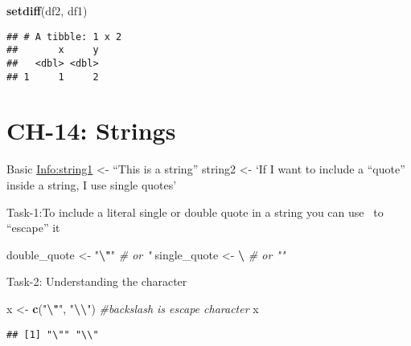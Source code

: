\documentclass[
]{article}
\newenvironment{Shaded}{\begin{snugshade}}{\end{snugshade}}
\newcommand{\CommentTok}[1]{\textcolor[rgb]{0.56,0.35,0.01}{\textit{#1}}}
\newcommand{\FunctionTok}[1]{\textcolor[rgb]{0.13,0.29,0.53}{\textbf{#1}}}
\newcommand{\NormalTok}[1]{#1}
\newcommand{\OtherTok}[1]{\textcolor[rgb]{0.56,0.35,0.01}{#1}}
\newcommand{\SpecialCharTok}[1]{\textcolor[rgb]{0.81,0.36,0.00}{\textbf{#1}}}
\newcommand{\StringTok}[1]{\textcolor[rgb]{0.31,0.60,0.02}{#1}}
\begin{document}
\begin{Shaded}
\begin{Highlighting}[]
\FunctionTok{setdiff}\NormalTok{(df2, df1)}
\end{Highlighting}
\end{Shaded}

\begin{verbatim}
## # A tibble: 1 x 2
##       x     y
##   <dbl> <dbl>
## 1     1     2
\end{verbatim}

\hypertarget{ch-14-strings}{%
\section{CH-14: Strings}\label{ch-14-strings}}

Basic \url{Info:string1} \textless- ``This is a string'' string2
\textless- `If I want to include a ``quote'' inside a string, I use
single quotes'

Task-1:To include a literal single or double quote in a string you can
use ~to ``escape'' it

\begin{Shaded}
\begin{Highlighting}[]
\NormalTok{double\_quote }\OtherTok{\textless{}{-}} \StringTok{"}\SpecialCharTok{\textbackslash{}"}\StringTok{"} \CommentTok{\# or \textquotesingle{}"\textquotesingle{}}
\NormalTok{single\_quote }\OtherTok{\textless{}{-}} \StringTok{\textquotesingle{}}\SpecialCharTok{\textbackslash{}\textquotesingle{}}\StringTok{\textquotesingle{}} \CommentTok{\# or "\textquotesingle{}"}
\end{Highlighting}
\end{Shaded}

Task-2: Understanding the character

\begin{Shaded}
\begin{Highlighting}[]
\NormalTok{x }\OtherTok{\textless{}{-}} \FunctionTok{c}\NormalTok{(}\StringTok{"}\SpecialCharTok{\textbackslash{}"}\StringTok{"}\NormalTok{, }\StringTok{"}\SpecialCharTok{\textbackslash{}\textbackslash{}}\StringTok{"}\NormalTok{) }\CommentTok{\#backslash is escape character}
\NormalTok{x}
\end{Highlighting}
\end{Shaded}

\begin{verbatim}
## [1] "\"" "\\"
\end{verbatim}
\end{document}
